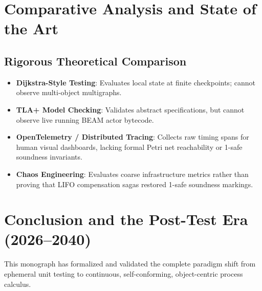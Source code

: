 \documentclass[11pt,a4paper,oneside]{book}
\theoremstyle{definition}
\begin{document}
\chapter{Comparative Analysis and State of the Art}

\section{Rigorous Theoretical Comparison}
\begin{itemize}
    \item \textbf{Dijkstra-Style Testing}: Evaluates local state at finite checkpoints; cannot observe multi-object multigraphs.
    \item \textbf{TLA+ Model Checking}: Validates abstract specifications, but cannot observe live running BEAM actor bytecode.
    \item \textbf{OpenTelemetry / Distributed Tracing}: Collects raw timing spans for human visual dashboards, lacking formal Petri net reachability or 1-safe soundness invariants.
    \item \textbf{Chaos Engineering}: Evaluates coarse infrastructure metrics rather than proving that LIFO compensation sagas restored 1-safe soundness markings.
\end{itemize}

\chapter{Conclusion and the Post-Test Era (2026--2040)}

This monograph has formalized and validated the complete paradigm shift from ephemeral unit testing to continuous, self-conforming, object-centric process calculus.
\end{document}
